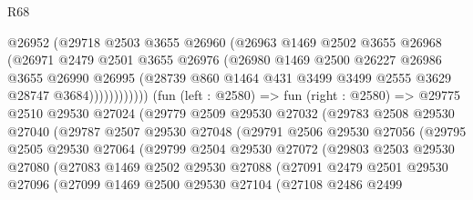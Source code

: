 \begin{lexlean}{R68}
\begin{coremodule}
                      @26952
                      (@29718
                        @2503
                        @3655
                        @26960
                        (@26963
                          @1469
                          @2502
                          @3655
                          @26968
                          (@26971
                            @2479
                            @2501
                            @3655
                            @26976
                            (@26980
                              @1469
                              @2500
                              @26227
                              @26986
                              @3655
                              @26990
                              @26995
                              (@28739
                                @860
                                @1464
                                @431
                                @3499
                                @3499
                                @2555
                                @3629
                                @28747
                                @3684))))))))))))
        (fun (left : @2580) =>
        fun (right : @2580) =>
        @29775
          @2510
          @29530
          @27024
          (@29779
            @2509
            @29530
            @27032
            (@29783
              @2508
              @29530
              @27040
              (@29787
                @2507
                @29530
                @27048
                (@29791
                  @2506
                  @29530
                  @27056
                  (@29795
                    @2505
                    @29530
                    @27064
                    (@29799
                      @2504
                      @29530
                      @27072
                      (@29803
                        @2503
                        @29530
                        @27080
                        (@27083
                          @1469
                          @2502
                          @29530
                          @27088
                          (@27091
                            @2479
                            @2501
                            @29530
                            @27096
                            (@27099
                              @1469
                              @2500
                              @29530
                              @27104
                              (@27108
                                @2486
                                @2499

\end{coremodule}
\end{lexlean}
